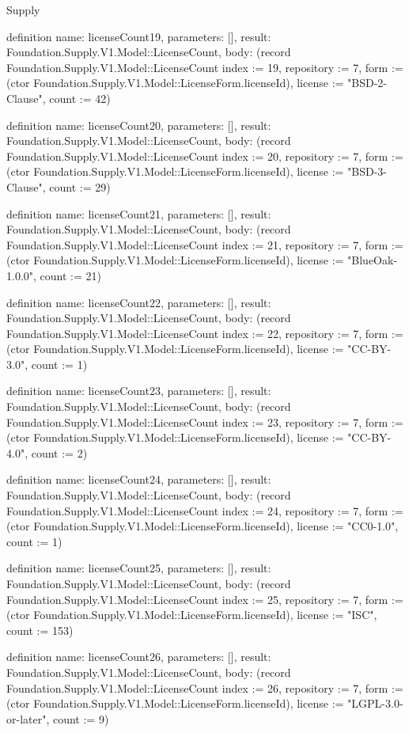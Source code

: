 \begin{lexlean}{Supply}
\begin{semanticmodule}
definition{
  name: licenseCount19,
  parameters: [],
  result: Foundation.Supply.V1.Model::LicenseCount,
  body: (record Foundation.Supply.V1.Model::LicenseCount {index := 19, repository := 7, form := (ctor Foundation.Supply.V1.Model::LicenseForm.licenseId), license := "BSD-2-Clause", count := 42})
}

definition{
  name: licenseCount20,
  parameters: [],
  result: Foundation.Supply.V1.Model::LicenseCount,
  body: (record Foundation.Supply.V1.Model::LicenseCount {index := 20, repository := 7, form := (ctor Foundation.Supply.V1.Model::LicenseForm.licenseId), license := "BSD-3-Clause", count := 29})
}

definition{
  name: licenseCount21,
  parameters: [],
  result: Foundation.Supply.V1.Model::LicenseCount,
  body: (record Foundation.Supply.V1.Model::LicenseCount {index := 21, repository := 7, form := (ctor Foundation.Supply.V1.Model::LicenseForm.licenseId), license := "BlueOak-1.0.0", count := 21})
}

definition{
  name: licenseCount22,
  parameters: [],
  result: Foundation.Supply.V1.Model::LicenseCount,
  body: (record Foundation.Supply.V1.Model::LicenseCount {index := 22, repository := 7, form := (ctor Foundation.Supply.V1.Model::LicenseForm.licenseId), license := "CC-BY-3.0", count := 1})
}

definition{
  name: licenseCount23,
  parameters: [],
  result: Foundation.Supply.V1.Model::LicenseCount,
  body: (record Foundation.Supply.V1.Model::LicenseCount {index := 23, repository := 7, form := (ctor Foundation.Supply.V1.Model::LicenseForm.licenseId), license := "CC-BY-4.0", count := 2})
}

definition{
  name: licenseCount24,
  parameters: [],
  result: Foundation.Supply.V1.Model::LicenseCount,
  body: (record Foundation.Supply.V1.Model::LicenseCount {index := 24, repository := 7, form := (ctor Foundation.Supply.V1.Model::LicenseForm.licenseId), license := "CC0-1.0", count := 1})
}

definition{
  name: licenseCount25,
  parameters: [],
  result: Foundation.Supply.V1.Model::LicenseCount,
  body: (record Foundation.Supply.V1.Model::LicenseCount {index := 25, repository := 7, form := (ctor Foundation.Supply.V1.Model::LicenseForm.licenseId), license := "ISC", count := 153})
}

definition{
  name: licenseCount26,
  parameters: [],
  result: Foundation.Supply.V1.Model::LicenseCount,
  body: (record Foundation.Supply.V1.Model::LicenseCount {index := 26, repository := 7, form := (ctor Foundation.Supply.V1.Model::LicenseForm.licenseId), license := "LGPL-3.0-or-later", count := 9})
}


\end{semanticmodule}
\end{lexlean}
